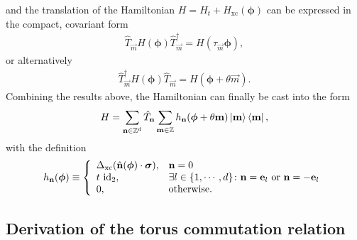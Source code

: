 \documentclass[
    aps,
    prb,
    twocolumn,
    floatfix,
    superscriptaddress,
	10pt
]{revtex4-2}
\begin{document}
and the translation of the Hamiltonian $H = H_t + H_\mathrm{xc}(\boldsymbol{\phi})$ can  be expressed in the compact, covariant form
\begin{align}
\hat{T}_\vec{m}	H( \boldsymbol{\phi} )\hat{T}_\vec{m}^\dagger
 = H( \tau_\vec{m}\boldsymbol{\phi} ) ,
\end{align}
or alternatively
\begin{align}
	\hat{T}_\vec{m}^\dagger	H( \boldsymbol{\phi} )\hat{T}_\vec{m}
	 = H( \boldsymbol{\phi} +  \theta\vec{m} ) .
	\end{align}
Combining the results above, the Hamiltonian can finally be cast into the form
\begin{equation}
	H =  \sum_{\mathbf{n} \in \mathbb{Z}^d} \hat{T}_{\mathbf{n}}  \sum_{\mathbf{m} \in \mathbb{Z}} h_{\mathbf{n}}(  \boldsymbol{\phi} + \theta \mathbf{m}  ) \ket{ \mathbf{m}} \bra{ \mathbf{m}} ,
\end{equation}
with the definition
\begin{equation}
	h_{\mathbf{n}}(  \boldsymbol{\phi} )
	\equiv
	\left\lbrace
	\begin{array}{ll}
		\Delta_\mathrm{xc} (\hat{\mathbf{n}} ( \boldsymbol{\phi}) \cdot \boldsymbol{\sigma}) , & \mathbf{n} = 0  \\
		t~\mathrm{id}_2, & \exists l \in \lbrace 1,\cdots,d \rbrace\colon \mathbf{n} = \mathbf{e}_l ~\text{or}~\mathbf{n} = -\mathbf{e}_l \\
		0, & \text{otherwise.}
		\end{array}
	\right.
\end{equation}



\subsection{Derivation of the torus commutation relation}
\end{document}
